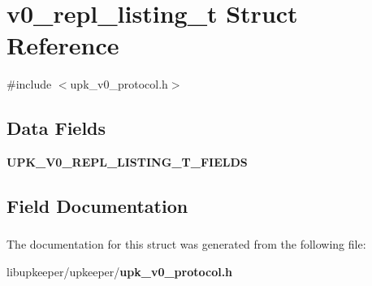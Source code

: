 \section{v0\_\-repl\_\-listing\_\-t Struct Reference}
\label{structv0__repl__listing__t}


{\ttfamily \#include $<$upk\_\-v0\_\-protocol.h$>$}

\subsection*{Data Fields}
\begin{DoxyCompactItemize}
\item 
{\bf UPK\_\-V0\_\-REPL\_\-LISTING\_\-T\_\-FIELDS}
\end{DoxyCompactItemize}


\subsection{Field Documentation}
\subsubsection[{UPK\_\-V0\_\-REPL\_\-LISTING\_\-T\_\-FIELDS}]{}\label{structv0__repl__listing__t_a8ad9c1cb73f7490a1fbc81c98428d261}


The documentation for this struct was generated from the following file:\begin{DoxyCompactItemize}
\item 
libupkeeper/upkeeper/{\bf upk\_\-v0\_\-protocol.h}\end{DoxyCompactItemize}
